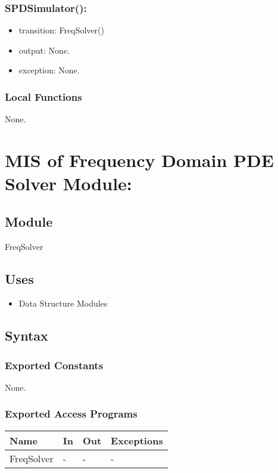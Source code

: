 \documentclass[12pt, titlepage]{article}
\begin{document}
\subsubsection*{SPDSimulator():}
\begin{itemize}
	\item transition:
	\subitem FreqSolver() 
	\item output: None. 
	\item exception: None.
\end{itemize}

\subsubsection{Local Functions}
None.



\newpage
%
%
%
%
\section{MIS of Frequency Domain PDE Solver Module:} 

\subsection{Module}
FreqSolver


\subsection{Uses}
\begin{itemize}
	\item Data Structure Modules
\end{itemize}

\subsection{Syntax}

\subsubsection{Exported Constants}
None.
\subsubsection{Exported Access Programs}

\begin{center}
	\begin{tabular}{p{2cm} p{4cm} p{4cm} p{2cm}}
		\hline
		\textbf{Name} & \textbf{In} & \textbf{Out} & \textbf{Exceptions} \\
		\hline
		FreqSolver & - & - & - \\
		\hline
	\end{tabular}
\end{center}
\end{document}

